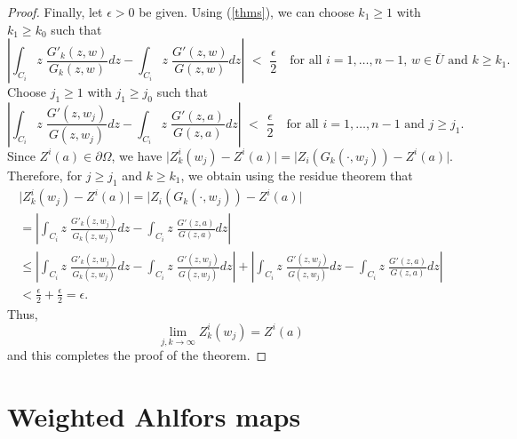 \documentclass[11pt, reqno]{amsart}
\numberwithin{equation}{section}
\begin{document}
\begin{proof}
		Finally, let $\epsilon>0$ be given. Using (\ref{thms}), we can choose $k_1\ge 1$ with $k_1\geq k_0$ such that
		\[
		\left\lvert
		\int_{C_i} z \; \frac{{G'_k}(z, w)}{G_k(z,w)} dz - \int_{C_i}  z \; \frac{G'(z, w)}{G(z,w)} dz 
		\right\rvert
		\,\,<\,\,
		\frac{\epsilon}{2}
		\quad
		\text{for all }i=1,\ldots, n-1,
		\,w\in\overline{U}
		\text{ and }
		k\geq k_1.
		\]
		Choose $j_1 \ge 1$ with $j_1\geq j_0$ such that
		\[
		\left\lvert
		\int_{C_i} z \; \frac{G'(z, w_j)}{G(z,w_j)} dz - \int_{C_i} z \; \frac{G'(z, a)}{G(z,a)} dz 
		\right\rvert 
		\,\,<\,\,
		\frac{\epsilon}{2}
		\quad
		\text{for all }i=1,\ldots, n-1
		\text{ and }
		j\geq j_1.
		\]
		Since $Z^i(a)\in\partial\Omega$, we have $\vert Z^i_k(w_j) - Z^i(a) \vert = \vert Z_i(G_k(\cdot,w_j)) - Z^i(a)\vert$. Therefore, for $j\geq j_1$ and $k\geq k_1$, we obtain using the residue theorem that
		\begin{multline*}
			\vert Z^i_k(w_j) - Z^i(a) \vert
			=
			\vert Z_i(G_k(\cdot,w_j)) - Z^i(a)\vert
			\\
			=
			\left\lvert
			\int_{C_i} z \; \frac{G'_k(z, w_j)}{G_k(z,w_j)} dz - \int_{C_i} z \; \frac{G'(z, a)}{G(z,a)} dz
			\right\rvert
			\\
			\leq
			\left\lvert
			\int_{C_i} z \; \frac{G'_k(z, w_j)}{G_k(z,w_j)} dz - \int_{C_i} z \;\frac{G'(z, w_j)}{G(z,w_j)} dz
			\right\rvert
			+
			\left\lvert
			\int_{C_i} z \;\frac{G'(z, w_j)}{G(z,w_j)} dz - \int_{C_i} z \; \frac{G'(z, a)}{G(z,a)} dz
			\right\rvert
			\\
			<
			\frac{\epsilon}{2} + \frac{\epsilon}{2} 
			= \epsilon.
		\end{multline*}
		Thus, 
		\begin{equation}
		\lim_{j,k\rightarrow\infty} Z^i_{k}(w_j) = Z^i(a)
		\end{equation}
		and this completes the proof of the theorem.		
	\end{proof}
	
	
	
	
	\section{Weighted Ahlfors maps}
	
\end{document}
